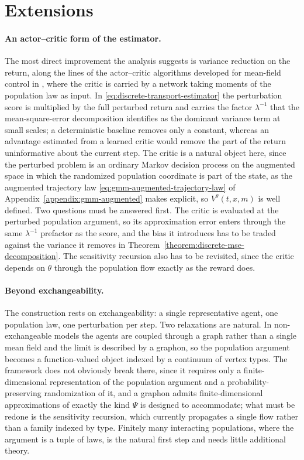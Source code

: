\section{Extensions}
\label{sec:extensions}

\paragraph{An actor--critic form of the estimator.}
The most direct improvement the analysis suggests is variance reduction on the return, along the lines of the actor--critic algorithms developed for mean-field control in \cite{pham2025actor}, where the critic is carried by a network taking moments of the population law as input. In \eqref{eq:discrete-transport-estimator} the perturbation score is multiplied by the full perturbed return and carries the factor $\lambda^{-1}$ that the mean-square-error decomposition identifies as the dominant variance term at small scales; a deterministic baseline removes only a constant, whereas an advantage estimated from a learned critic would remove the part of the return uninformative about the current step. The critic is a natural object here, since the perturbed problem is an ordinary Markov decision process on the augmented space in which the randomized population coordinate is part of the state, as the augmented trajectory law \eqref{eq:gmm-augmented-trajectory-law} of Appendix~\ref{appendix:gmm-augmented} makes explicit, so $V^\theta(t,x,m)$ is well defined. Two questions must be answered first. The critic is evaluated at the perturbed population argument, so its approximation error enters through the same $\lambda^{-1}$ prefactor as the score, and the bias it introduces has to be traded against the variance it removes in Theorem~\ref{theorem:discrete-mse-decomposition}. The sensitivity recursion also has to be revisited, since the critic depends on $\theta$ through the population flow exactly as the reward does.

\paragraph{Beyond exchangeability.}
The construction rests on exchangeability: a single representative agent, one population law, one perturbation per step. Two relaxations are natural. In non-exchangeable models \cite{common_noise} the agents are coupled through a graph rather than a single mean field and the limit is described by a graphon, so the population argument becomes a function-valued object indexed by a continuum of vertex types. The framework does not obviously break there, since it requires only a finite-dimensional representation of the population argument and a probability-preserving randomization of it, and a graphon admits finite-dimensional approximations of exactly the kind $\Psi$ is designed to accommodate; what must be redone is the sensitivity recursion, which currently propagates a single flow rather than a family indexed by type. Finitely many interacting populations, where the argument is a tuple of laws, is the natural first step and needs little additional theory.


